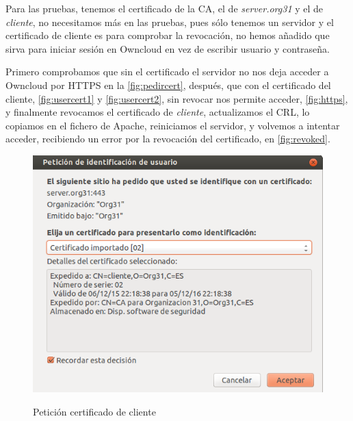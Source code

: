 \documentclass[]{article}
\begin{document}
\hfill

Para las pruebas, tenemos el certificado de la CA, el de \textit{server.org31} y el de \textit{cliente}, no necesitamos más en las pruebas, pues sólo tenemos un servidor y el certificado de cliente es para comprobar la revocación, no hemos añadido que sirva para iniciar sesión en Owncloud en vez de escribir usuario y contraseña.

Primero comprobamos que sin el certificado el servidor no nos deja acceder a Owncloud por HTTPS en la \autoref{fig:pedircert}, después, que con el certificado del cliente, \autoref{fig:usercert1} y \autoref{fig:usercert2}, sin revocar nos permite acceder,  \autoref{fig:https}, y finalmente revocamos el certificado de \textit{cliente}, actualizamos el CRL, lo copiamos en el fichero de Apache, reiniciamos el servidor, y volvemos a intentar acceder, recibiendo un error por la revocación del certificado, en \autoref{fig:revoked}.


\begin{figure}[h]
	\caption{Petición certificado de cliente}
	\centering
	\includegraphics[scale=0.5]{images/certs/pedircert.png}
	\label{fig:pedircert}
\end{figure}
\end{document}

